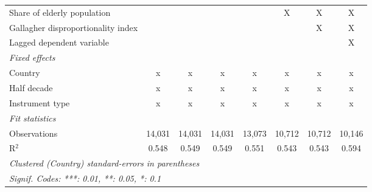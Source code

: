 \begin{tabular}{lccccccc}
   Share of elderly population                                                            &              &             &             &             & X            & X            & X\\  
   Gallagher disproportionality index                                                     &              &             &             &             &              & X            & X\\  
   Lagged dependent variable                                                              &              &             &             &             &              &              & X\\  
   \emph{Fixed effects}\\
   Country                                                                                & x            & x           & x           & x           & x            & x            & x\\  
   Half decade                                                                            & x            & x           & x           & x           & x            & x            & x\\  
   Instrument type                                                                        & x            & x           & x           & x           & x            & x            & x\\  
   \midrule \emph{Fit statistics}\\
   Observations                                                                           & 14,031       & 14,031      & 14,031      & 13,073      & 10,712       & 10,712       & 10,146\\  
   R$^2$                                                                                  & 0.548        & 0.549       & 0.549       & 0.551       & 0.543        & 0.543        & 0.594\\  
   \midrule
   \multicolumn{8}{l}{\emph{Clustered (Country) standard-errors in parentheses}}\\
   \multicolumn{8}{l}{\emph{Signif. Codes: ***: 0.01, **: 0.05, *: 0.1}}\\
\end{tabular}
\par\endgroup



